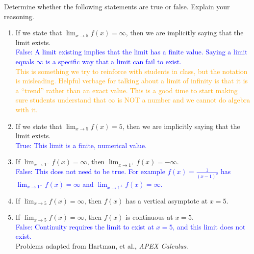 \documentclass{ximera}
\begin{document}
\begin{exercise}
    Determine whether the following statements are true or false.  Explain your reasoning.
    \begin{enumerate}
        \item If we state that $\lim_{x\rightarrow 5}f(x)=\infty$, then we are implicitly saying that the limit exists.\\
        \textcolor{blue}{False: A limit existing implies that the limit has a finite value.  Saying a limit equals $\infty$ is a specific way that a limit can fail to exist.}\\
        \textcolor{orange}{This is something we try to reinforce with students in class, but the notation is misleading.  Helpful verbage for talking about a limit of infinity is that it is a ``trend'' rather than an exact value.  This is a good time to start making sure students understand that $\infty$ is NOT a number and we cannot do algebra with it. }
        \item If we state that $\lim_{x\rightarrow 5}f(x)=5$, then we are implicitly saying that the limit exists.\\
        \textcolor{blue}{True: This limit is a finite, numerical value.}
        \item If $\lim_{x\rightarrow 1^-}f(x)=\infty$, then $\lim_{x\rightarrow 1^+}f(x)=-\infty$.\\
        \textcolor{blue}{False: This does not need to be true.  For example $f(x)=\frac{1}{(x-1)^2}$ has $\lim_{x\rightarrow 1^-}f(x)=\infty$ and $\lim_{x\rightarrow 1^+}f(x)=\infty$.}
        \item If $\lim_{x\rightarrow 5}f(x)=\infty$, then $f(x)$ has a vertical asymptote at $x=5$.
        \item If $\lim_{x\rightarrow 5}f(x)=\infty$, then $f(x)$ is continuous at $x=5$.\\
        \textcolor{blue}{False: Continuity requires the limit to exist at $x=5$, and this limit does not exist.}\\
         Problems adapted from Hartman, et al., \textit{APEX Calculus}.
    \end{enumerate} 
\end{exercise}
\end{document}
